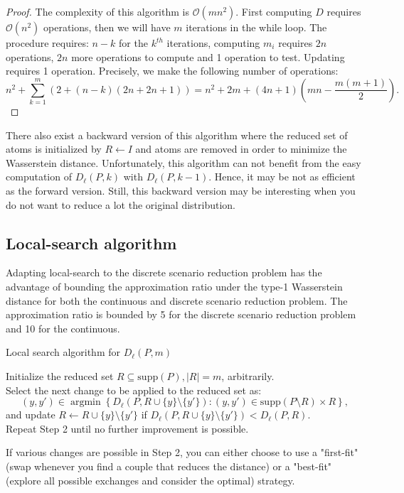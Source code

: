 \documentclass{amsart}
\newcommand{\argmin}{\mathop{\arg\min}}
\begin{document}
\begin{proof}\label{complexity}
The complexity of this algorithm is $\mathcal{O}\left(mn^2\right)$. First computing $D$ requires $\mathcal{O}\left(n^2\right)$ operations, then we will have $m$ iterations in the while loop. The procedure requires: $n-k$ for the $k^{th}$ iterations, computing $m_i$ requires $2n$ operations, $2n$ more operations to compute and 1 operation to test. Updating requires 1 operation.
Precisely, we make the following number of operations:
$$
n^2+\sum_{k=1}^m\left(2+\left(n-k\right)\left(2n+2n+1\right)\right)= n^2+2m+\left(4n+1\right)\left(mn-\frac{m\left(m+1\right)}{2}\right).
$$
\end{proof}
There also exist a backward version of this algorithm where the reduced set of atoms is initialized by $R\gets I$ and atoms are removed in order to minimize the Wasserstein distance. Unfortunately, this algorithm can not benefit from the easy computation of $D_\ell\left(P,k\right)$ with $D_\ell\left(P,k-1\right)$. Hence, it may be not as efficient as the forward version. Still, this backward version may be interesting when you do not want to reduce a lot the original distribution.
\subsection{Local-search algorithm}\label{guarant}
Adapting local-search to the discrete scenario reduction problem has the advantage of bounding the approximation ratio under the type-1 Wasserstein distance for both the continuous and discrete scenario reduction problem. The approximation ratio is bounded by 5 for the discrete scenario reduction problem and 10 for the continuous.
\begin{algorithm}
    \caption{Local search algorithm for $D_\ell\left(P,m\right)$}\label{Local search}
    Initialize the reduced set $R\subseteq \text{supp}\left(P\right), \lvert R\rvert = m$, arbitrarily. \\ Select the next change to be applied to the reduced set as: 
    $$
    \left(y,y'\right)\in\argmin\left\{D_\ell\left(P,R\cup\{y\}\setminus \{y'\}\right) : \left(y,y'\right)\in\text{supp}\left(P\setminus R\right)\times R\right\},
    $$
    and update $R\gets R\cup \{y\}\setminus \{y'\}$ if $D_\ell\left(P, R\cup\{y\}\setminus \{y'\} \right)<D_\ell\left(P,R\right).$ \\ Repeat Step 2 until no further improvement is possible.
\end{algorithm}

If various changes are possible in Step 2, you can either choose to use a "first-fit" (swap whenever you find a couple that reduces the distance) or a "best-fit" (explore all possible exchanges and consider the optimal) strategy.
\end{document}
